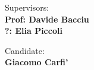 \begin{titlepage}
\begin{center}
    
\end{center}
\vspace{15mm}

\begin{minipage}[t]{0.47\textwidth}
	{\large{Supervisors:}{\normalsize\vspace{3mm}
	\bf\\ \large{Prof: Davide Bacciu} \normalsize\vspace{3mm}\bf \\ \large{?: Elia Piccoli}}}
\end{minipage}
\hfill
\begin{minipage}[t]{0.47\textwidth}\raggedleft
	{\large{Candidate:}{\normalsize\vspace{3mm} \bf\\ \large{Giacomo Carfi'}}}
\end{minipage}

\vspace{23mm}
\hrulefill
\\

\end{titlepage}
